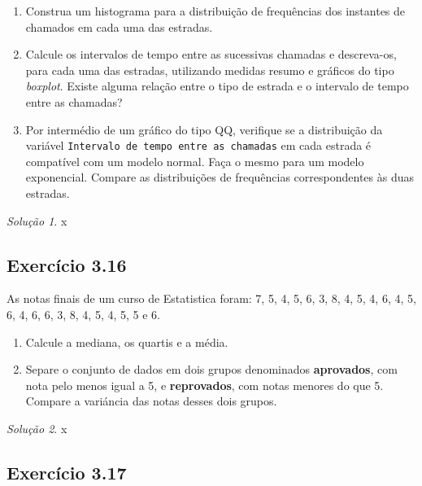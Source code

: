 \documentclass[
]{latex/krantz}
\providecommand{\tightlist}{%
  \setlength{\itemsep}{0pt}\setlength{\parskip}{0pt}}
\theoremstyle{definition}
\theoremstyle{definition}
\theoremstyle{definition}
\theoremstyle{definition}
\theoremstyle{remark}
\newtheorem*{solution}{Solução}
\begin{document}
\begin{enumerate}
\def\labelenumi{\alph{enumi})}
\tightlist
\item
  Construa um histograma para a distribuição de frequências dos instantes de chamados em cada uma das estradas.
\item
  Calcule os intervalos de tempo entre as sucessivas chamadas e descreva-os, para cada uma das estradas, utilizando medidas resumo e gráficos do tipo \emph{boxplot}. Existe alguma relação entre o tipo de estrada e o intervalo de tempo entre as chamadas?
\item
  Por intermédio de um gráfico do tipo QQ, verifique se a distribuição da variável \texttt{Intervalo\ de\ tempo\ entre\ as\ chamadas} em cada estrada é compatível com um modelo normal. Faça o mesmo para um modelo exponencial. Compare as distribuições de frequências correspondentes às duas estradas.
\end{enumerate}

\begin{solution}
x
\end{solution}

\hypertarget{exr3-16}{%
\subsection*{Exercício 3.16}\label{exr3-16}}

As notas finais de um curso de Estatistica foram: 7, 5, 4, 5, 6, 3, 8, 4, 5, 4, 6, 4, 5, 6, 4, 6, 6, 3, 8, 4, 5, 4, 5, 5 e 6.

\begin{enumerate}
\def\labelenumi{\alph{enumi})}
\tightlist
\item
  Calcule a mediana, os quartis e a média.
\item
  Separe o conjunto de dados em dois grupos denominados \textbf{aprovados}, com nota pelo menos igual a 5, e \textbf{reprovados}, com notas menores do que 5. Compare a variáncia das notas desses dois grupos.
\end{enumerate}

\begin{solution}
x
\end{solution}

\hypertarget{exr3-17}{%
\subsection*{Exercício 3.17}\label{exr3-17}}
\end{document}
